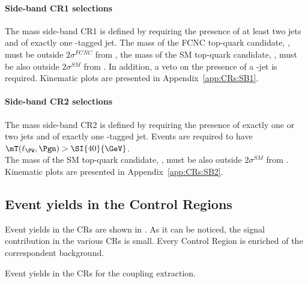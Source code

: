 \paragraph{Side-band CR1 selections}
\label{sec:bkg:sbcr1tzu}
The mass side-band CR1 is defined by requiring the presence of at least two jets
and of exactly one \Pqb-tagged jet.
The mass of the FCNC top-quark candidate, \mtopfcnc,
must be outside $2\sigma^{FCNC}$ from \mtopvalue, the mass of the
SM top-quark candidate, \mtopsm, must be also outside $2\sigma^{SM}$
from \mtopvalue.  In addition, a veto on the presence of a \Pqc-jet is required. 
Kinematic plots are presented in Appendix~\ref{app:CRs:SB1}.

\paragraph{Side-band CR2 selections}
\label{sec:bkg:sbcr2}
The mass side-band CR2 is defined by requiring the presence of exactly one or two jets
and of exactly one \Pqb-tagged jet.  
Events are required to have $\mT(\ell_{\PW},\Pgn) > \SI{40}{\GeV}$.\\
The mass of the SM top-quark candidate, \mtopsm, must be also outside $2\sigma^{SM}$
from \mtopvalue. Kinematic plots are presented in Appendix~\ref{app:CRs:SB2}.

\subsection{Event yields in the Control Regions}
Event yields in the CRs are shown in . 
As it can be noticed, the signal contribution in the various CRs is small.
Every Control Region is enriched of the correspondent background. 
\begin{table}[htbp]
	\footnotesize
	\centering
	
	\caption{Event yields in the CRs for the \tZc coupling extraction. \TabErrStatSys} 
	\label{tab:bkg:yields:tzc}
\end{table} 

